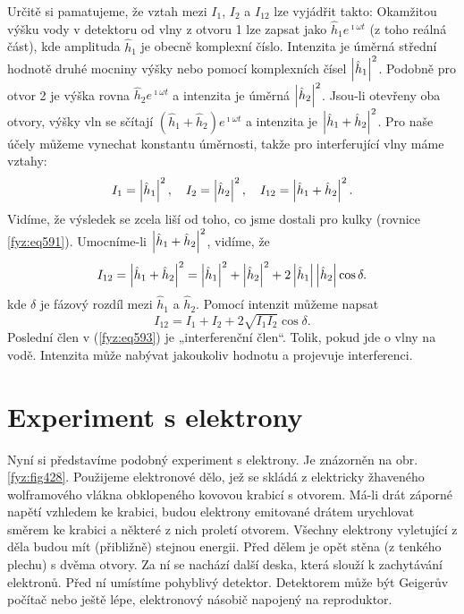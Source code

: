     Určitě si pamatujeme, že vztah mezi \(I_{1}\), \(I_{2}\) a \(I_{12}\)  lze vyjádřit takto:
    Okamžitou výšku vody v detektoru od vlny z otvoru 1 lze zapsat jako \(\hat{h}_1e^{\imath\omega
    t}\) (z toho reálná část), kde amplituda \(\hat{h}_1\) je obecně komplexní číslo. Intenzita je
    úměrná střední hodnotě druhé mocniny výšky nebo pomocí komplexních čísel \(\left\lvert\hat{h}_1\right\rvert^2\).
    Podobně pro otvor 2 je výška rovna \(\hat{h}_2e^{\imath\omega t}\)  a intenzita je úměrná
    \(\left\lvert\hat{h}_2\right\rvert^2\). Jsou-li otevřeny oba otvory, výšky vln se sčítají \((\hat{h}_1 +
    \hat{h}_2)e^{\imath\omega t}\)  a intenzita je \(\left\lvert\hat{h}_1 + \hat{h}_2\right\rvert^2\). Pro naše účely
    můžeme vynechat konstantu úměrnosti, takže pro interferující vlny máme vztahy:
    \begin{equation}\label{fyz:eq592}
      I_1 = \left\lvert\hat{h}_1\right\rvert^2, \quad I_2 = \left\lvert\hat{h}_2\right\rvert^2, \quad 
      I_{12} = \left\lvert\hat{h}_1 + \hat{h}_2\right\rvert^2.
    \end{equation}
    Vidíme, že výsledek se zcela liší od toho, co jsme dostali pro kulky (rovnice \ref{fyz:eq591}).
    Umocníme-li \(\left\lvert\hat{h}_1 + \hat{h}_2\right\rvert^2\), vidíme, že
    \begin{equation*}
      I_{12} = \left\lvert\hat{h}_1 + \hat{h}_2\right\rvert^2 
             = \left\lvert\hat{h}_1\right\rvert^2 + \left\lvert\hat{h}_2\right\rvert^2 + 2\left\lvert\hat{h}_1\right\rvert\left\lvert\hat{h}_2\right\rvert\cos\delta.
    \end{equation*}
    kde \(\delta\) je fázový rozdíl mezi \(\hat{h}_1\) a \(\hat{h}_2\). Pomocí intenzit můžeme
    napsat
    \begin{equation}\label{fyz:eq593}
      I_{12} = I_1 + I_2 + 2\sqrt{I_1I_2}\cos\delta.
    \end{equation}
    Poslední člen v (\ref{fyz:eq593}) je „interferenční člen“. Tolik, pokud jde o vlny na vodě.
    Intenzita může nabývat jakoukoliv hodnotu a projevuje interferenci.

  \section{Experiment s elektrony}\label{fyz:IchapXXXVIIsecIV}
    Nyní si představíme podobný experiment s elektrony. Je znázorněn na obr. \ref{fyz:fig428}.
    Použijeme elektronové dělo, jež se skládá z elektricky žhaveného wolframového vlákna obklopeného
    kovovou krabicí s otvorem. Má-li drát záporné napětí vzhledem ke krabici, budou elektrony
    emitované drátem urychlovat směrem ke krabici a některé z nich proletí otvorem. Všechny elektrony
    vyletující z děla budou mít (přibližně) stejnou energii. Před dělem je opět stěna (z tenkého
    plechu) s dvěma otvory. Za ní se nachází další deska, která slouží k zachytávání elektronů. Před
    ní umístíme pohyblivý detektor. Detektorem může být Geigerův počítač nebo ještě lépe, elektronový
    násobič napojený na reproduktor.

